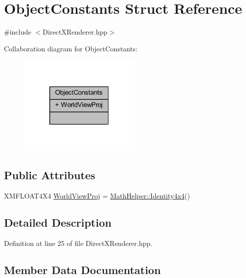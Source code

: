 \hypertarget{struct_object_constants}{}\section{Object\+Constants Struct Reference}
\label{struct_object_constants}


{\ttfamily \#include $<$Direct\+X\+Renderer.\+hpp$>$}



Collaboration diagram for Object\+Constants\+:\nopagebreak
\begin{figure}[H]
\begin{center}
\leavevmode
\includegraphics[width=169pt]{struct_object_constants__coll__graph}
\end{center}
\end{figure}
\subsection*{Public Attributes}
\begin{DoxyCompactItemize}
\item 
X\+M\+F\+L\+O\+A\+T4\+X4 \hyperlink{struct_object_constants_a274b083a5402569466d1e86844ab4dec_a274b083a5402569466d1e86844ab4dec}{World\+View\+Proj} = \hyperlink{class_math_helper_a68b4e9af95b1a36aad30ea80839f6b19_a68b4e9af95b1a36aad30ea80839f6b19}{Math\+Helper\+::\+Identity4x4}()
\end{DoxyCompactItemize}


\subsection{Detailed Description}


Definition at line 25 of file Direct\+X\+Renderer.\+hpp.



\subsection{Member Data Documentation}
